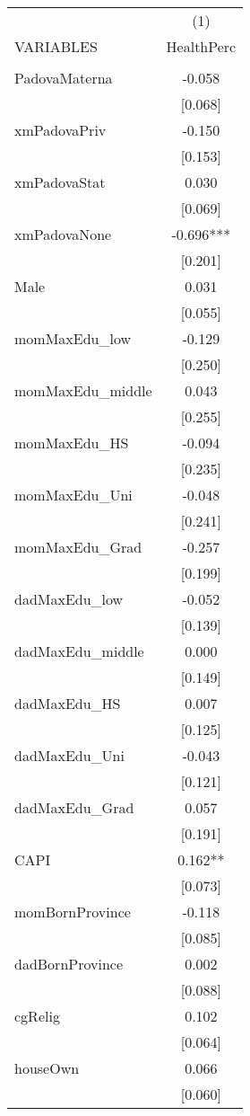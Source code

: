 \documentclass[]{article}
\begin{document}
\begin{tabular}{lc} \hline
 & (1) \\
VARIABLES & HealthPerc \\ \hline
 &  \\
PadovaMaterna & -0.058 \\
 & [0.068] \\
xmPadovaPriv & -0.150 \\
 & [0.153] \\
xmPadovaStat & 0.030 \\
 & [0.069] \\
xmPadovaNone & -0.696*** \\
 & [0.201] \\
Male & 0.031 \\
 & [0.055] \\
momMaxEdu\_low & -0.129 \\
 & [0.250] \\
momMaxEdu\_middle & 0.043 \\
 & [0.255] \\
momMaxEdu\_HS & -0.094 \\
 & [0.235] \\
momMaxEdu\_Uni & -0.048 \\
 & [0.241] \\
momMaxEdu\_Grad & -0.257 \\
 & [0.199] \\
dadMaxEdu\_low & -0.052 \\
 & [0.139] \\
dadMaxEdu\_middle & 0.000 \\
 & [0.149] \\
dadMaxEdu\_HS & 0.007 \\
 & [0.125] \\
dadMaxEdu\_Uni & -0.043 \\
 & [0.121] \\
dadMaxEdu\_Grad & 0.057 \\
 & [0.191] \\
CAPI & 0.162** \\
 & [0.073] \\
momBornProvince & -0.118 \\
 & [0.085] \\
dadBornProvince & 0.002 \\
 & [0.088] \\
cgRelig & 0.102 \\
 & [0.064] \\
houseOwn & 0.066 \\
 & [0.060] \\

\end{tabular}
\end{document}
